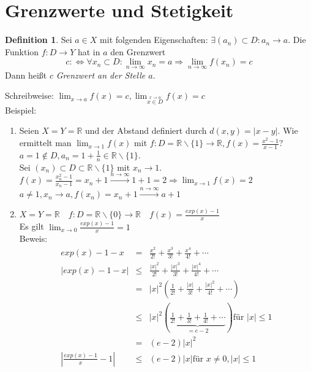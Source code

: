 \documentclass[ngerman,titlepage,twoside, parskip=half*]{scrreprt}
\newcommand*{\R}{\mathbb{R}}
\newcommand*{\perdef}{:\Leftrightarrow}
\theoremstyle{plain}
\theoremstyle{definition}
\newtheorem{definition}{Definition}
\theoremstyle{remark}
\begin{document}
\section{Grenzwerte und Stetigkeit}
\begin{definition}
Sei $a\in X$ mit folgenden Eigenschaften: $\exists (a_n)\subset D\colon a_n\rightarrow a$. Die Funktion $f\colon D\rightarrow Y$
hat in $a$ den Grenzwert 
\[c\perdef \forall x_n \subset D\colon\lim_{n\rightarrow \infty} x_n=a\Rightarrow \lim_{n\rightarrow \infty} f(x_n)=c\]
Dann heißt $c$ \emph{Grenzwert an der Stelle $a$}.
\end{definition}
Schreibweise: $\lim_{x\rightarrow a} f(x)=c, 
\lim_{\stackrel{x\rightarrow a}{x \in D}} f(x)=c$\\
Beispiel:
\begin{enumerate}[(1)]
  \item Seien $X=Y=\R$ und der Abstand definiert durch $d(x,y)=|x-y|$. Wie ermittelt man $\lim_{x\rightarrow 1} f(x)$
    mit $f\colon D=\R \backslash \{1\}\rightarrow \R, f(x)=\frac{x^2-1}{x-1}$? $a=1\notin D, a_n=1+\frac{1}{n} \in \R\backslash
    \{1\}$.\\
    Sei $(x_n)\subset D \subset \R \backslash \{1\}$ mit $x_n\rightarrow 1$.\\
    $f(x)=\frac{x_n^2 -1}{x_n-1}=x_n+1 \stackrel{n\rightarrow \infty}{\rightarrow} 1+1=2 \Rightarrow \lim_{x \rightarrow 1}
    f(x)=2$\\
    $a\neq 1, x_n\rightarrow a, f(x_n)=x_n+1 \stackrel{n \rightarrow \infty}{\rightarrow} a+1$
  \item $X=Y=\R \quad f\colon D=\R\backslash \{0\}\rightarrow \R \quad f(x)=\frac{exp(x)-1}{x}$\\
    Es gilt $\lim_{x\rightarrow 0} \frac{exp(x)-1}{x}=1$\\
    Beweis: 
    \begin{align*}
      exp(x)-1-x & = & \frac{x^2}{2!}+\frac{x^3}{3!}+\frac{x^4}{4!}+\cdots\\
      |exp(x)-1-x| & \leq & \frac{|x|^2}{2!}+\frac{|x|^3}{3!}+\frac{|x|^4}{4!}+\cdots\\
      & = & |x|^2\left(\frac{1}{2!}+\frac{|x|}{3!}+\frac{|x|^2}{4!}+\cdots\right)\\
      & \leq & |x|^2\left(\underbrace{\frac{1}{2!}+\frac{1}{3!}+\frac{1}{4!}+\cdots}_{=e-2}\right) \text{für } |x|\leq 1\\
      & = & (e-2)|x|^2\\
      \left|\frac{exp(x)-1}{x}-1\right| & \leq & (e-2)|x| \text{für } x\neq 0, |x|\leq 1

\end{align*}
\end{enumerate}
\end{document}
